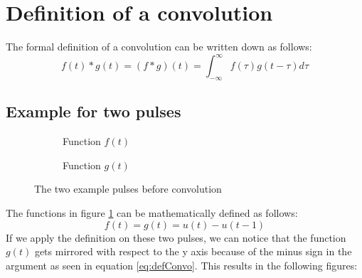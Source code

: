 \documentclass[]{subfiles}
\begin{document}
	\section{Definition of a convolution}
	The formal definition of a convolution can be written down as follows:
	\begin{equation}
		\label{eq:defConvo}
		f(t)\ast g(t) = (f\ast g)(t) = \int_{-\infty}^{\infty} f(\tau) g(t-\tau) d\tau
	\end{equation}
\subsection{Example for two pulses}
\begin{figure}[h]
	\centering
	\begin{subfigure}{.4\textwidth}
		\begin{center}
		\end{center}
	\caption{Function $f(t)$}
	\end{subfigure}%
	\begin{subfigure}{.4\textwidth}
		\begin{center}
		\end{center}
	\caption{Function $g(t)$}
	\end{subfigure}
\caption{The two example pulses before convolution}
\label{fig:convoVoorbeeld}
\end{figure}
The functions in figure \ref{fig:convoVoorbeeld} can be mathematically defined as follows:
\begin{equation}
	f(t) = g(t) = u(t)-u(t-1)
\end{equation}
If we apply the definition on these two pulses, we can notice that the function $g(t)$ gets mirrored with respect to the y axis because of the minus sign in the argument as seen in equation \ref{eq:defConvo}. This results in the following figures:  \\
\end{document}
